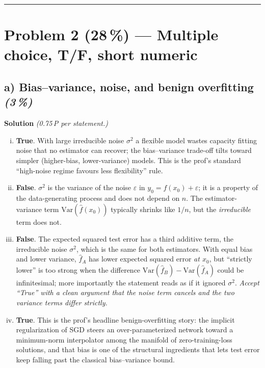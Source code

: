 \documentclass[11pt,a4paper]{article}
\newcommand{\points}[1]{\textbf{(#1\,\%)}}
\newcommand{\subpoints}[1]{\textit{(#1\,\%)}}
\newcommand{\sol}{\noindent\textbf{Solution}}
\begin{document}
\vspace{0.6em}
\hrule
\vspace{1em}

\section*{Problem 2 \points{28} --- Multiple choice, T/F, short numeric}

\subsection*{a) Bias--variance, noise, and benign overfitting \subpoints{3}}
\sol{} \emph{(0.75\,P per statement.)}
\begin{enumerate}[(i)]
  \item \textbf{True}. With large irreducible noise $\sigma^2$ a flexible model wastes capacity
        fitting noise that no estimator can recover; the bias--variance trade-off tilts toward
        simpler (higher-bias, lower-variance) models. This is the prof's standard ``high-noise
        regime favours less flexibility'' rule.
  \item \textbf{False}. $\sigma^2$ is the variance of the noise $\varepsilon$ in
        $y_0 = f(x_0) + \varepsilon$; it is a property of the data-generating process and does
        not depend on $n$. The estimator-variance term $\mathrm{Var}(\hat f(x_0))$ typically
        shrinks like $1/n$, but the \emph{irreducible} term does not.
  \item \textbf{False}. The expected squared test error has a third additive term, the
        irreducible noise $\sigma^2$, which is the same for both estimators. With equal bias
        and lower variance, $\hat f_A$ has lower expected squared error \emph{at $x_0$}, but
        ``strictly lower'' is too strong when the difference $\mathrm{Var}(\hat f_B) -
        \mathrm{Var}(\hat f_A)$ could be infinitesimal; more importantly the statement reads as
        if it ignored $\sigma^2$. \emph{Accept ``True'' with a clean argument that the noise
        term cancels and the two variance terms differ strictly.}
  \item \textbf{True}. This is the prof's headline benign-overfitting story: the implicit
        regularization of SGD steers an over-parameterized network toward a minimum-norm
        interpolator among the manifold of zero-training-loss solutions, and that bias is one
        of the structural ingredients that lets test error keep falling past the classical
        bias--variance bound.
\end{enumerate}
\end{document}
